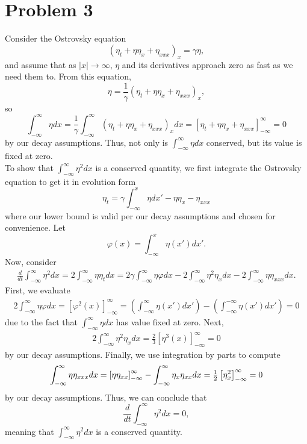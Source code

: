 \documentclass{article}
\begin{document}
\section{Problem 3}
Consider the Ostrovsky equation
\[
\left(\eta_t+\eta \eta_x+\eta_{xxx}\right)_x=\gamma \eta,
\]
and assume that as $|x|\rightarrow \infty$, $\eta$ and its derivatives approach zero as fast as we need them to. From this equation,
\[
\eta=\frac{1}{\gamma}\left(\eta_t+\eta \eta_x+\eta_{xxx}\right)_x,
\]
so
\[
\int_{-\infty}^{\infty}\eta dx=\frac{1}{\gamma}\int_{-\infty}^{\infty}\left(\eta_t+\eta \eta_x+\eta_{xxx}\right)_xdx=\left[\eta_t+\eta \eta_x+\eta_{xxx}\right]_{-\infty}^{\infty}=0
\]
by our decay assumptions. Thus, not only is $\int_{-\infty}^\infty \eta dx$ conserved, but its value is fixed at zero.\\
To show that $\int_{-\infty}^\infty \eta^2 dx$ is a conserved quantity, we first integrate the Ostrovsky equation to get it in evolution form
\[
\eta_t=\gamma\int_{-\infty}^{x}\eta dx'-\eta\eta_x-\eta_{xxx}
\]
where our lower bound is valid per our decay assumptions and chosen for convenience. Let
\[
\varphi(x)=\int_{-\infty}^{x}\eta(x') dx'.
\]
Now, consider
\begin{align*}
\frac{d}{dt}\int_{-\infty}^\infty \eta^2 dx=2\int_{-\infty}^\infty \eta\eta_t dx=2\gamma\int_{-\infty}^\infty\eta\varphi dx-2\int_{-\infty}^\infty\eta^2\eta_xdx-2\int_{-\infty}^\infty\eta\eta_{xxx}dx.
\end{align*}
First, we  evaluate
\begin{align*}
2\int_{-\infty}^\infty\eta\varphi dx=\left[\varphi^2(x)\right]_{-\infty}^\infty=\left(\int_{-\infty}^{\infty}\eta(x') dx'\right)-\left(\int_{-\infty}^{-\infty}\eta(x') dx'\right)=0
\end{align*}
due to the fact that $\int_{-\infty}^\infty \eta dx$ has value fixed at zero.
Next,
\begin{align*}
2\int_{-\infty}^\infty\eta^2\eta_xdx=\frac{2}{3}\left[\eta^3(x)\right]_{-\infty}^\infty=0
\end{align*}
by our decay assumptions. Finally, we use integration by parts to compute
\begin{align*}
\int_{-\infty}^\infty\eta\eta_{xxx}dx=\left[\eta\eta_{xx}\right]_{-\infty}^\infty-\int_{-\infty}^\infty\eta_x\eta_{xx}dx=\mbox{$\frac{1}{2}$}\left[\eta_x^2\right]_{-\infty}^\infty=0
\end{align*}
by our decay assumptions. Thus, we can conclude that
\[
\frac{d}{dt}\int_{-\infty}^\infty \eta^2 dx=0,
\]
meaning that $\int_{-\infty}^\infty \eta^2 dx$ is a conserved quantity.\\
\end{document}
